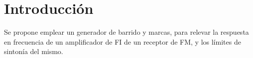   \section{Introducción}
    Se propone emplear un generador de barrido y marcas, para relevar la respuesta en 
    frecuencia de un amplificador de FI de un receptor de FM, y los límites de sintonía
    del mismo.


    